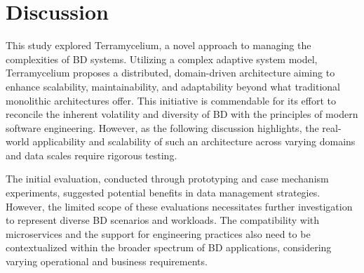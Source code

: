 \documentclass[preprint,12pt]{elsarticle}
\begin{document}


\section{Discussion} \label{sec:discussion}

This study explored Terramycelium, a novel approach to managing the complexities of BD systems. Utilizing a complex adaptive system model, Terramycelium proposes a distributed, domain-driven architecture aiming to enhance scalability, maintainability, and adaptability beyond what traditional monolithic architectures offer. This initiative is commendable for its effort to reconcile the inherent volatility and diversity of BD with the principles of modern software engineering. However, as the following discussion highlights, the real-world applicability and scalability of such an architecture across varying domains and data scales require rigorous testing.

The initial evaluation, conducted through prototyping and case mechanism experiments, suggested potential benefits in data management strategies. However, the limited scope of these evaluations necessitates further investigation to represent diverse BD scenarios and workloads. The compatibility with microservices and the support for engineering practices also need to be contextualized within the broader spectrum of BD applications, considering varying operational and business requirements.
\end{document}
